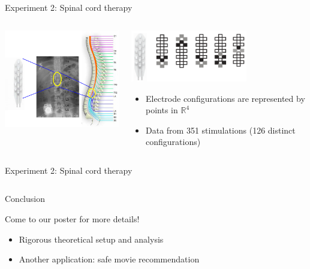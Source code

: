 \documentclass[xetex,10pt,mathserif,handout]{beamer}
\newlength\figureheight
\newlength\figurewidth
\begin{document}
\begin{frame}{Experiment 2: Spinal cord therapy}
\begin{columns}[c]
\begin{center}
\includegraphics[width=2.5in]{figures/config1.png}
\end{center}
\begin{center}
\includegraphics[width=2in]{figures/config2.png}
\vspace{2em}
\begin{itemize}
\item Electrode configurations are represented by points in $\mathbb{R}^4$
\vspace{1em}
\item Data from 351 stimulations (126 distinct configurations)
\end{itemize}
\end{center}
\end{columns}
\end{frame}

\begin{frame}{Experiment 2: Spinal cord therapy}
\begin{columns}[c]
\begin{center}
\setlength\figurewidth{2.5in}
\setlength\figureheight{1.7in}
\end{center}
\centering
\setlength\figurewidth{2.5in}
\setlength\figureheight{3.7in}
\end{columns}
\end{frame}

\begin{frame}{Conclusion}

{\large Come to our poster for more details!}
\vspace{2em}
\begin{itemize}
  \item Rigorous theoretical setup and analysis
  \vspace{1em}
  \item Another application: safe movie recommendation
\end{itemize}
\end{frame}
\end{document}
